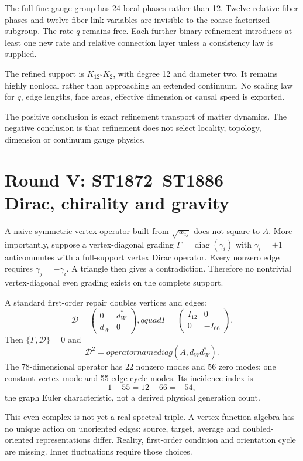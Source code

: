 \documentclass[11pt,a4paper]{article}
\begin{document}
The full fine gauge group has 24 local phases rather than 12.  Twelve relative
fiber phases and twelve fiber link variables are invisible to the coarse
factorized subgroup.  The rate $q$ remains free.  Each further binary
refinement introduces at least one new rate and relative connection layer
unless a consistency law is supplied.

The refined support is $K_{12}\square K_2$, with degree 12 and diameter two.
It remains highly nonlocal rather than approaching an extended continuum.
No scaling law for $q$, edge lengths, face areas, effective dimension or causal
speed is exported.

The positive conclusion is exact refinement transport of matter dynamics.
The negative conclusion is that refinement does not select locality, topology,
dimension or continuum gauge physics.

\section{Round V: ST1872--ST1886 --- Dirac, chirality and gravity}

A naive symmetric vertex operator built from $\sqrt{w_{ij}}$ does not square
to $A$.  More importantly, suppose a vertex-diagonal grading
$\Gamma=\operatorname{diag}(\gamma_i)$ with $\gamma_i=\pm1$ anticommutes with a
full-support vertex Dirac operator.  Every nonzero edge requires
$\gamma_j=-\gamma_i$.  A triangle then gives a contradiction.  Therefore no
nontrivial vertex-diagonal even grading exists on the complete support.

A standard first-order repair doubles vertices and edges:
\[
\mathcal D=
\begin{pmatrix}0&d_W^*\\d_W&0\end{pmatrix},qquad
\Gamma=\begin{pmatrix}I_{12}&0\\0&-I_{66}\end{pmatrix}.
\]
Then $\{\Gamma,\mathcal D\}=0$ and
\[
\mathcal D^2=operatorname{diag}(A,d_Wd_W^*).
\]
The 78-dimensional operator has 22 nonzero modes and 56 zero modes: one
constant vertex mode and 55 edge-cycle modes.  Its incidence index is
\[
1-55=12-66=-54,
\]
the graph Euler characteristic, not a derived physical generation count.

This even complex is not yet a real spectral triple.  A vertex-function
algebra has no unique action on unoriented edges: source, target, average and
doubled-oriented representations differ.  Reality, first-order condition and
orientation cycle are missing.  Inner fluctuations require those choices.
\end{document}
